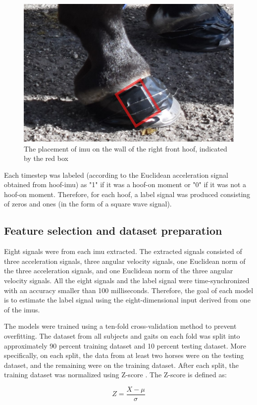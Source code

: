 \begin{figure}[htbp]
\centering
\includegraphics[width=.5\linewidth]{chapters/Step/figures/hoof_step.png}
\caption{The placement of \gls{imu} on the wall of the right front hoof, indicated by the red box}
\label{hoof}
\end{figure}
	
Each timestep was labeled (according to the Euclidean acceleration signal obtained from hoof-\gls{imu}) as "1" if it was a hoof-on moment or "0" if it was not a hoof-on moment. Therefore, for each hoof, a label signal was produced consisting of zeros and ones (in the form of a square wave signal).
	
\subsection{Feature selection and dataset preparation}

	Eight signals were from each \gls{imu} extracted. The extracted signals consisted of three acceleration signals, three angular velocity signals, one Euclidean norm of the three acceleration signals, and one Euclidean norm of the three angular velocity signals. All the eight signals and the label signal were time-synchronized with an accuracy smaller than 100 milliseconds. Therefore, the goal of each model is to estimate the label signal using the eight-dimensional input derived from one of the \gls{imu}s.
	
The models were trained using a ten-fold cross-validation method to prevent overfitting. The dataset from all subjects and gaits on each fold was split into approximately 90 percent training dataset and 10 percent testing dataset. More specifically, on each split, the data from at least two horses were on the testing dataset, and the remaining were on the training dataset. After each split, the training dataset was normalized using Z-score \cite{clarkcarter_2014_z}. The Z-score is defined as:

\begin{equation}\label{eq:zscore}
Z = \frac{X - \mu}{\sigma}
\end{equation}

